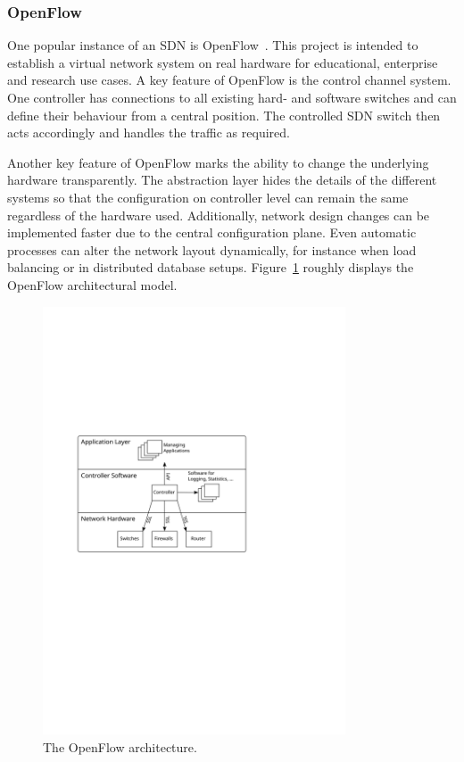 \documentclass[a4paper,
		12pt,
		parskip=full,
		titlepage
		]{scrartcl}
\begin{document}
\subsubsection{OpenFlow}
One popular instance of an SDN is OpenFlow~\cite{openflow_spec10}.
This project is intended to establish a virtual network system on real hardware 
for educational, enterprise and research use cases.
A key feature of OpenFlow is the control channel system.
One controller has connections to all existing hard- and software switches and can define their behaviour from a central position.
The controlled SDN switch then acts accordingly and handles the traffic as required.

Another key feature of OpenFlow marks the ability to change the underlying hardware transparently.
The abstraction layer hides the details of the different systems so that 
the configuration on controller level can remain the same regardless of the hardware used.
Additionally, network design changes can be implemented faster due to the central configuration plane.
Even automatic processes can alter the network layout dynamically, for instance when load balancing 
or in distributed database setups.
Figure~\ref{fig:openflow-arch} roughly displays the  OpenFlow architectural model.

\begin{figure}
\centering
\includegraphics[width=0.8\textwidth]{images/openflow-arch}
\caption{The OpenFlow architecture.}
\label{fig:openflow-arch}
\end{figure}
\end{document}
